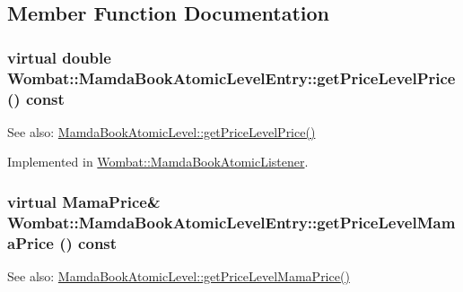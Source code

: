 \subsection{Member Function Documentation}
\hypertarget{classWombat_1_1MamdaBookAtomicLevelEntry_a82493957cc92858ad4f0c1d5cfbbbec}{
\subsubsection[getPriceLevelPrice]{\setlength{\rightskip}{0pt plus 5cm}virtual double Wombat::Mamda\-Book\-Atomic\-Level\-Entry::get\-Price\-Level\-Price () const}}
\label{classWombat_1_1MamdaBookAtomicLevelEntry_a82493957cc92858ad4f0c1d5cfbbbec}


\begin{Desc}
\item[See also:]\hyperlink{classWombat_1_1MamdaBookAtomicLevel_5bcc378cd2085048f8fa1870265e5ce0}{Mamda\-Book\-Atomic\-Level::get\-Price\-Level\-Price()} \end{Desc}


Implemented in \hyperlink{classWombat_1_1MamdaBookAtomicListener_7139c6ddcae27c429e7dade0c5e91358}{Wombat::Mamda\-Book\-Atomic\-Listener}.\hypertarget{classWombat_1_1MamdaBookAtomicLevelEntry_ac54c871b12fb6c0c59f255633cc7496}{
\subsubsection[getPriceLevelMamaPrice]{\setlength{\rightskip}{0pt plus 5cm}virtual Mama\-Price\& Wombat::Mamda\-Book\-Atomic\-Level\-Entry::get\-Price\-Level\-Mama\-Price () const}}
\label{classWombat_1_1MamdaBookAtomicLevelEntry_ac54c871b12fb6c0c59f255633cc7496}


\begin{Desc}
\item[See also:]\hyperlink{classWombat_1_1MamdaBookAtomicLevel_e250b6d0ba73f1396a7ac16a18564fc7}{Mamda\-Book\-Atomic\-Level::get\-Price\-Level\-Mama\-Price()} \end{Desc}


